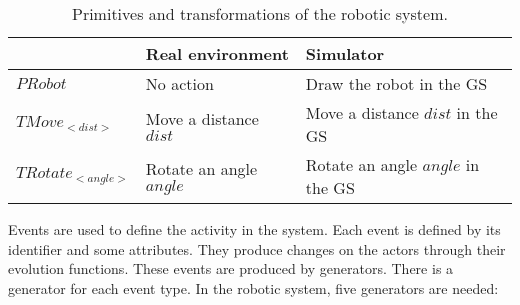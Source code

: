 \documentclass{svmult}
\begin{document}
\vspace{-0.3cm}
\begin{table}[h]
\begin{center}
\begin{tabular} {|l|l|l|}
\hline
	 & Real environment & Simulator \\
\hline
	$PRobot$ & No action & Draw the robot in the GS \\
\hline
	$TMove_{<dist>}$ & Move a distance $dist$ & Move a distance $dist$ in the GS \\
\hline
	$TRotate_{<angle>}$ & Rotate an angle $angle$ & Rotate an angle $angle$ in the GS \\
\hline
\end{tabular}
\end{center}
\caption{Primitives and transformations of the robotic system.}
\label {tab:PrimTransf}
\end{table}


Events are used to define the activity in the system. Each event is defined by its identifier and some attributes. They produce changes on the actors through their evolution functions. 
These events are produced by generators. There is a generator for each event type. In the robotic system, five generators are needed:
\end{document}
